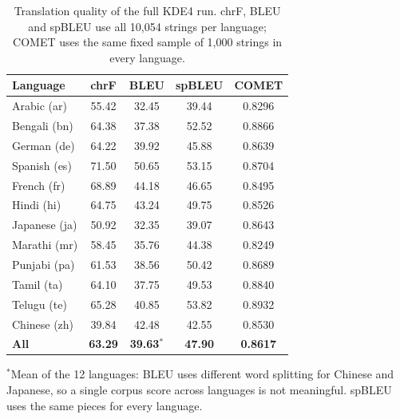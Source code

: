 \begin{table}[H]
\centering
\caption[Translation quality of the full KDE4 run]{Translation quality of the full KDE4 run. chrF, BLEU and spBLEU use
all 10,054 strings per language; COMET uses the same fixed sample of 1,000 strings in every language.}
\label{tab:kde4quality}
\begin{tabular}{@{}l S[table-format=2.2] S[table-format=2.2] S[table-format=2.2] S[table-format=1.4]@{}}
\toprule
\textbf{Language} & {\textbf{chrF}} & {\textbf{BLEU}} & {\textbf{spBLEU}} & {\textbf{COMET}} \\
\midrule
Arabic (ar) & 55.42 & 32.45 & 39.44 & 0.8296 \\
Bengali (bn) & 64.38 & 37.38 & 52.52 & 0.8866 \\
German (de) & 64.22 & 39.92 & 45.88 & 0.8639 \\
Spanish (es) & 71.50 & 50.65 & 53.15 & 0.8704 \\
French (fr) & 68.89 & 44.18 & 46.65 & 0.8495 \\
Hindi (hi) & 64.75 & 43.24 & 49.75 & 0.8526 \\
Japanese (ja) & 50.92 & 32.35 & 39.07 & 0.8643 \\
Marathi (mr) & 58.45 & 35.76 & 44.38 & 0.8249 \\
Punjabi (pa) & 61.53 & 38.56 & 50.42 & 0.8689 \\
Tamil (ta) & 64.10 & 37.75 & 49.53 & 0.8840 \\
Telugu (te) & 65.28 & 40.85 & 53.82 & 0.8932 \\
Chinese (zh) & 39.84 & 42.48 & 42.55 & 0.8530 \\
\midrule
\textbf{All} & \bfseries 63.29 & {\bfseries 39.63$^{\ast}$} & \bfseries 47.90 & \bfseries 0.8617 \\
\bottomrule
\end{tabular}

\smallskip
{\footnotesize $^{\ast}$Mean of the 12 languages: BLEU uses different word splitting for Chinese and Japanese, so a single
corpus score across languages is not meaningful. spBLEU uses the same pieces for every language.}
\end{table}


